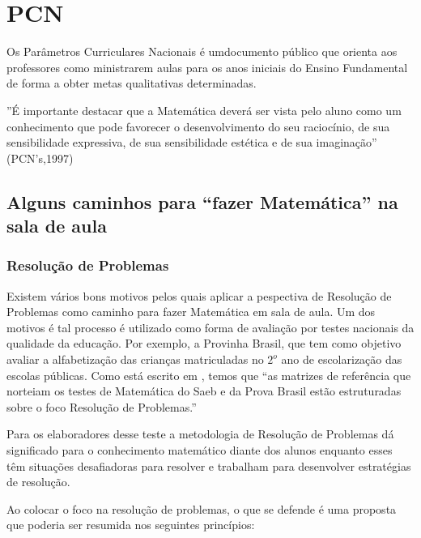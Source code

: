 \chapter{PCN}
Os Parâmetros Curriculares Nacionais é umdocumento público que orienta aos professores como ministrarem aulas para os anos iniciais do Ensino Fundamental de forma a obter metas qualitativas determinadas.

''É importante destacar que a Matemática deverá ser vista pelo aluno como um conhecimento que pode favorecer o desenvolvimento do seu raciocínio, de sua sensibilidade expressiva, de sua sensibilidade estética e de sua imaginação'' (PCN's,1997)

\section{Alguns caminhos para “fazer Matemática” na sala de aula}

\subsection{Resolução de Problemas}

Existem vários bons motivos pelos quais aplicar a pespectiva de Resolução de Problemas como caminho para fazer Matemática em sala de aula. Um dos motivos é tal processo é utilizado como forma de avaliação por testes nacionais da qualidade da educação.  Por exemplo, a Provinha Brasil, que tem como objetivo avaliar a alfabetização das crianças matriculadas no $2^o$ ano de escolarização das escolas públicas. Como está escrito em \cite{da2011plano}, temos que ``as matrizes de referência que norteiam os testes de Matemática do Saeb e da Prova Brasil estão estruturadas sobre o foco Resolução de Problemas.''

Para os elaboradores desse teste a metodologia de Resolução de Problemas dá significado para o conhecimento matemático diante dos alunos enquanto esses têm situações desafiadoras para resolver e trabalham para desenvolver estratégias de resolução.

Ao colocar o foco na resolução de problemas, o que se defende é uma proposta que poderia
ser resumida nos seguintes princípios:

